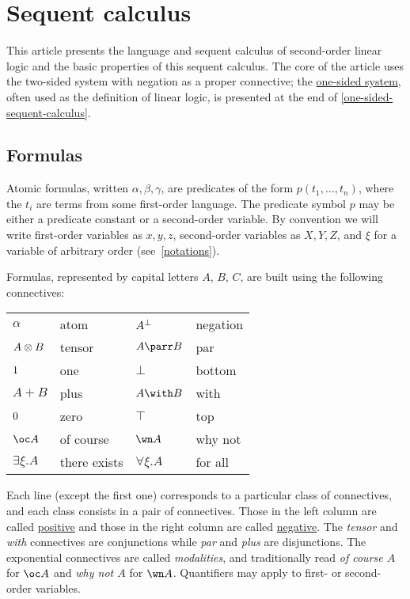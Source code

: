 \chapter{Sequent calculus}\label{sequent-calculus}

This article presents the language and sequent calculus of second-order
linear logic and the basic properties of this sequent calculus. The core
of the article uses the two-sided system with negation as a proper
connective; the \hyperref[one-sided-sequent-calculus]{one-sided
system}, often used as the definition of linear logic, is presented at
the end of \cref{one-sided-sequent-calculus}.

\section{Formulas}\label{formulas}

Atomic formulas, written \(\alpha,\beta,\gamma\), are predicates of the
form \(p(t_1,\ldots,t_n)\), where the \(t_i\) are terms from some
first-order language. The predicate symbol \(p\) may be either a
predicate constant or a second-order variable. By convention we will
write first-order variables as \(x,y,z\), second-order variables as
\(X,Y,Z\), and \(\xi\) for a variable of arbitrary order (see~\cref{notations}).

Formulas, represented by capital letters \(A\), \(B\), \(C\), are built
using the following connectives:

\begin{longtable}[]{@{}llll@{}}
\toprule
\(\alpha\) & atom & \(A^\bot\) & negation\tabularnewline
\(A \otimes B\) & tensor & \(A \parr B\) & par\tabularnewline
\(1\) & one & \(\bot\) & bottom\tabularnewline
\(A \plus B\) & plus & \(A \with B\) & with\tabularnewline
\(0\) & zero & \(\top\) & top\tabularnewline
\(\oc A\) & of course & \(\wn A\) & why not\tabularnewline
\(\exists \xi.A\) & there exists & \(\forall \xi.A\) & for
all\tabularnewline
\bottomrule
\end{longtable}

Each line (except the first one) corresponds to a particular class of
connectives, and each class consists in a pair of connectives. Those in
the left column are called \hyperref[positive-formula]{positive} and those
in the right column are called \hyperref[negative-formula]{negative}. The
\emph{tensor} and \emph{with} connectives are conjunctions while
\emph{par} and \emph{plus} are disjunctions. The exponential connectives
are called \emph{modalities}, and traditionally read \emph{of course
\(A\)} for \(\oc A\) and \emph{why not \(A\)} for \(\wn A\). Quantifiers
may apply to first- or second-order variables.

